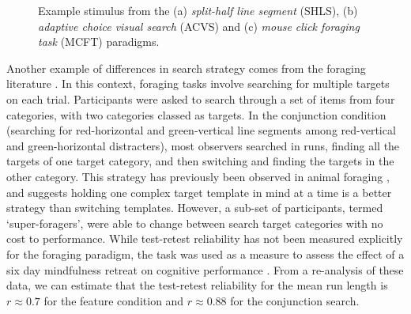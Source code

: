 \documentclass[a4paper, man, natbib, floatsintext]{apa6}
\begin{document}
\begin{figure}
\centering
{}
\caption{Example stimulus from the (a) \textit{split-half line segment} (SHLS), (b) \textit{adaptive choice visual search} (ACVS) and (c) \textit{mouse click foraging task} (MCFT) paradigms.}
\label{fig:exampleStimuli}
\end{figure}

Another example of differences in search strategy comes from the foraging literature  \citep{kristjansson2014,johannesson2016}. In this context, foraging tasks involve searching for multiple targets on each trial. Participants were asked to search through a set of items from four categories, with two categories classed as targets. In the conjunction condition (searching for red-horizontal and green-vertical line segments among red-vertical and green-horizontal distracters), most observers searched in runs, finding all the targets of one target category, and then switching and finding the targets in the other category. This strategy has previously been observed in animal foraging  \citep{dawkins1971}, and suggests holding one complex target template in mind at a time is a better strategy than switching templates. However, a sub-set of participants, termed `super-foragers', were able to change between search target categories with no cost to performance. While test-retest reliability has not been measured explicitly for the foraging paradigm, the task was used as a measure to assess the effect of a six day mindfulness retreat on cognitive performance \citep{hartkamp2017}. From a re-analysis of these data, we can estimate that the test-retest reliability for the mean run length is $r \approx 0.7$ for the feature condition and $r \approx 0.88$ for the conjunction search.  
\end{document}
